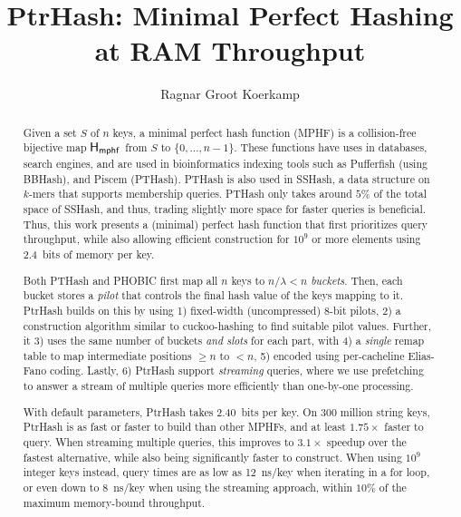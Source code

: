 \documentclass[a4paper,UKenglish,cleveref,thm-restate]{lipics-v2021}
\title{PtrHash: Minimal Perfect Hashing at RAM Throughput}
\author{Ragnar Groot Koerkamp}{ETH Zurich, Zurich, Switzerland}{ragnar.grootkoerkamp@inf.ethz.ch}{https://orcid.org/0000-0002-2091-1237}{ETH Research Grant ETH-1721-1 to Gunnar Rätsch.}
\begin{document}
\hypersetup{pageanchor=false}
\maketitle

\begin{abstract}
\label{sec:orgadeced1}
Given a set \(S\) of \(n\) keys, a minimal perfect hash function (MPHF) is a
collision-free bijective map \(\mathsf{H_{mphf}}\) from \(S\) to \(\{0, \dots, n-1\}\). These
functions have uses in databases, search engines, and are used in bioinformatics
indexing tools such as Pufferfish (using BBHash), and Piscem (PTHash).
PTHash is also used in SSHash, a data structure on $k$-mers that supports
membership queries. PTHash only takes around \(5\%\) of the
total space of SSHash, and thus, trading slightly more space for faster queries
is beneficial.
Thus, this work presents a (minimal) perfect hash function that
first prioritizes query throughput, while also allowing efficient construction
for \(10^9\) or more elements using 2.4~bits of memory per key.

Both PTHash and PHOBIC first map all \(n\) keys to \(n/\lambda < n\) \emph{buckets}.
Then, each bucket stores a \emph{pilot} that controls the final hash value of the
keys mapping to it.
PtrHash builds on this by using 1) fixed-width (uncompressed) 8-bit pilots, 2) a construction
algorithm similar to cuckoo-hashing to find suitable pilot values. Further, it 3)
uses the same number of buckets \emph{and slots} for each part, with 4) a \emph{single}
remap table to map intermediate positions \(\geq n\) to \(<n\), 5) encoded using
per-cacheline Elias-Fano coding. Lastly, 6) PtrHash support \emph{streaming} queries, where we use
prefetching to answer a stream of multiple queries more efficiently than one-by-one processing.

With default parameters, PtrHash takes 2.40~bits per key.
On 300 million string keys, PtrHash is as fast or faster
to build than other MPHFs, and at least \(1.75\times\) faster to query. When
streaming multiple queries, this improves to \(3.1\times\) speedup over the
fastest alternative, while also being significantly faster to construct.
When using \(10^9\) integer keys instead, query times are as
low as 12~ns/key when iterating in a for loop, or even down to 8~ns/key when using
the streaming approach, within \(10\%\) of the maximum memory-bound throughput.
\end{abstract}

\newpage
\end{document}
